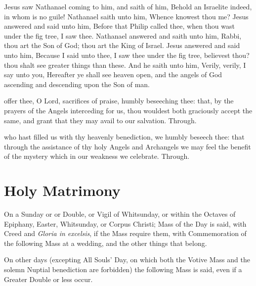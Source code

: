  Jesus saw Nathanael coming to him, and saith of him, Behold an Israelite indeed, in whom is no guile! Nathanael saith unto him, Whence knowest thou me? Jesus answered and said unto him, Before that Philip called thee, when thou wast under the fig tree, I saw thee. Nathanael answered and saith unto him, Rabbi, thou art the Son of God; thou art the King of Israel. Jesus answered and said unto him, Because I said unto thee, I saw thee under the fig tree, believest thou? thou shalt see greater things than these. And he saith unto him, Verily, verily, I say unto you, Hereafter ye shall see heaven open, and the angels of God ascending and descending upon the Son of man.


 offer thee, O Lord, sacrifices of praise, humbly beseeching thee: that, by the prayers of the Angels interceding for us, thou wouldest both graciously accept the same, and grant that they may avail to our salvation. Through.


 who hast filled us with thy heavenly benediction, we humbly beseech thee: that through the assistance of thy holy Angels and Archangels we may feel the benefit of the mystery which in our weakness we celebrate. Through.

\clearpage

\section{Holy Matrimony}\label{MatrimonyMass}
\fancyhead[RE,LO]{}
\begin{rubric}
    On a Sunday or  or  Double, or Vigil of Whitsunday, or within the Octaves of Epiphany, Easter, Whitsunday, or Corpus Christi; Mass of the Day is said, with Creed and \emph{Gloria in excelsis}, if the Mass require them, with Commemoration of the following Mass at a wedding, and the other things that belong.\par
    On other days (excepting All Souls' Day, on which both the Votive Mass and the solemn Nuptial benediction are forbidden) the following Mass is said, even if a Greater Double or less occur.
\end{rubric}

